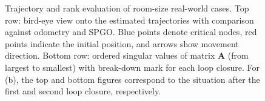 \documentclass[letterpaper, 10 pt, conference]{ieeeconf}  %
\begin{document}
\begin{figure}[h]
{    }%

\centering
\caption{Trajectory and rank evaluation of room-size real-world cases. Top row: bird-eye view onto the estimated trajectories with comparison against odometry and SPGO. Blue points denote critical nodes, red points indicate the initial position, and arrows show movement direction. Bottom row: ordered singular values of matrix $\mathbf{A}$ (from largest to smallest) with break-down mark for each loop closure. For (b), the top and bottom figures correspond to the situation after the first and second loop closure, respectively.}
\label{fig:no_gt_traj}
\end{figure}
\end{document}
